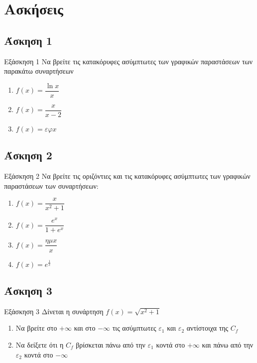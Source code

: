 \documentclass[greek]{beamer}
\begin{document}
\section{Ασκήσεις}
\subsection{Άσκηση 1}
\begin{frame}[label=Άσκηση1,t]{Εξάσκηση 1}
 Να βρείτε τις κατακόρυφες ασύμπτωτες των γραφικών παραστάσεων των παρακάτω συναρτήσεων
 \begin{enumerate}
  \item<1-> $f(x)=\dfrac{\ln x}{x}$
  \item<2-> $f(x)=\dfrac{x}{x-2}$
  \item<3-> $f(x)=εφ x$
 \end{enumerate}

\end{frame}

\subsection{Άσκηση 2}
\begin{frame}[label=Άσκηση2,t]{Εξάσκηση 2}
 Να βρείτε τις οριζόντιες και τις κατακόρυφες ασύμπτωτες των γραφικών παραστάσεων των συναρτήσεων:
 \begin{enumerate}
  \item<1-> $f(x)=\dfrac{x}{x^2+1}$
  \item<2-> $f(x)=\dfrac{e^x}{1+e^x}$
  \item<3-> $f(x)=\dfrac{ημx}{x}$
  \item<4-> $f(x)=e^{\frac{1}{x}}$
 \end{enumerate}

\end{frame}

\subsection{Άσκηση 3}
\begin{frame}[label=Άσκηση3,t]{Εξάσκηση 3}
 Δίνεται η συνάρτηση $f(x)=\sqrt{x^2+1}$
 \begin{enumerate}
  \item<1-> Να βρείτε στο $+\infty$ και στο $-\infty$ τις ασύμπτωτες $ε_1$ και $ε_2$ αντίστοιχα της $C_f$
  \item<2-> Να δείξετε ότι η $C_f$ βρίσκεται πάνω από την $ε_1$ κοντά στο $+\infty$ και πάνω από την $ε_2$ κοντά στο $-\infty$
 \end{enumerate}

\end{frame}
\end{document}
